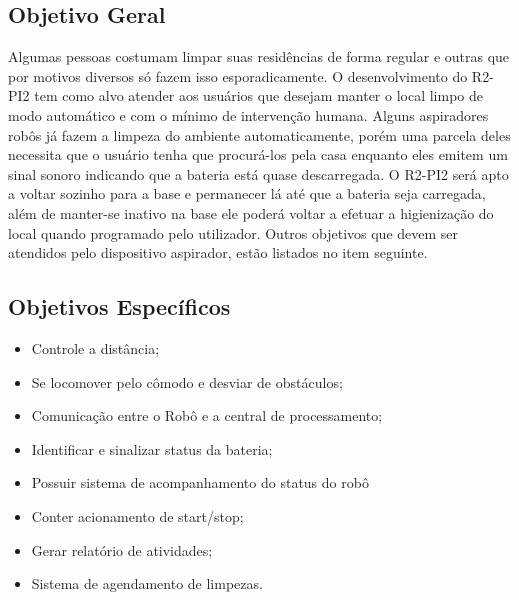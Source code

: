 
\subsection{Objetivo Geral} %
\label{sub:objetivo_geral}
	
	Algumas pessoas costumam limpar suas residências de forma regular e outras que por motivos diversos só fazem isso esporadicamente. O desenvolvimento do R2-PI2 tem como alvo atender aos usuários que desejam manter o local limpo de modo automático e com o mínimo de intervenção humana. Alguns aspiradores robôs já fazem a limpeza do ambiente automaticamente, porém uma parcela deles necessita que o usuário tenha que procurá-los pela casa enquanto eles emitem um sinal sonoro indicando que a bateria está quase descarregada. O R2-PI2 será apto a voltar sozinho para a base e permanecer lá até que a bateria seja carregada, além de manter-se inativo na base ele poderá voltar a efetuar a higienização do local quando programado pelo utilizador. Outros objetivos que devem ser atendidos pelo dispositivo aspirador, estão listados no item seguinte.


\subsection{Objetivos Específicos} %
\label{sub:objetivos_específicos}
	
	\begin{itemize}
		\item Controle a distância;
		\item Se locomover pelo cômodo e desviar de obstáculos;
		\item Comunicação entre o Robô e a central de processamento;
		\item Identificar e sinalizar status da bateria;
		\item Possuir sistema de acompanhamento do status do robô
		\item Conter acionamento de start/stop;
		\item Gerar relatório de atividades;
		\item Sistema de agendamento de limpezas.
	\end{itemize}
